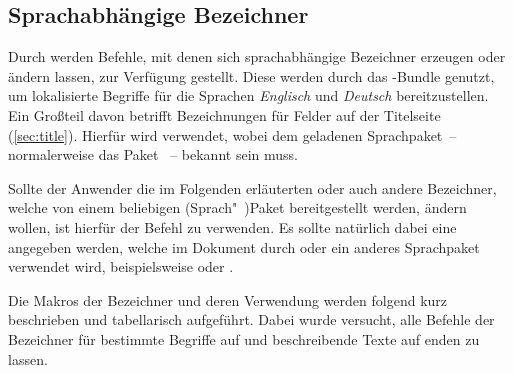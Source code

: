 \begin{DeclareEntity*}{}
\begin{DeclareEntity*}{}
\begin{DeclareEntity*}{}
\section{%
  Sprachabhängige Bezeichner%
  \label{sec:localization}%
}
%
Durch \KOMAScript werden Befehle, mit denen sich sprachabhängige Bezeichner 
erzeugen oder ändern lassen, zur Verfügung gestellt. Diese werden durch das
\TUDScript-Bundle genutzt, um lokalisierte Begriffe für die Sprachen 
\emph{Englisch} und \emph{Deutsch} bereitzustellen. Ein Großteil davon betrifft 
Bezeichnungen für Felder auf der Titelseite (\autoref{sec:title}). Hierfür wird
verwendet, wobei  dem geladenen Sprachpaket~-- normalerweise das 
Paket ~-- bekannt sein muss.

Sollte der Anwender die im Folgenden erläuterten oder auch andere Bezeichner, 
welche von einem beliebigen (Sprach"~)Paket bereitgestellt werden, ändern 
wollen, ist hierfür der Befehl
 zu 
verwenden. Es sollte natürlich dabei eine  angegeben werden, 
welche im Dokument durch  oder ein anderes Sprachpaket verwendet 
wird, beispielsweise  oder . 

Die Makros der Bezeichner und deren Verwendung werden folgend kurz beschrieben 
und tabellarisch aufgeführt. Dabei wurde versucht, alle Befehle der Bezeichner 
für bestimmte Begriffe auf  und beschreibende Texte auf 
 enden zu lassen.


\end{DeclareEntity*}
\end{DeclareEntity*}
\end{DeclareEntity*}
